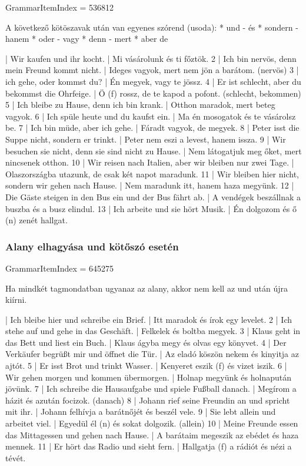 \documentclass{article}
\newenvironment{desc}{\verbatim}{\endverbatim}
\newenvironment{exmp}{\verbatim}{\endverbatim}
\begin{document}
GrammarItemIndex = 536812

\begin{desc}
A következő kötöszavak után van egyenes szórend (usoda):
* und - és
* sondern - hanem
* oder - vagy
* denn - mert
* aber  de
\end{desc}

\begin{exmp}
1 | Wir kaufen und ihr kocht. | Mi vásárolunk és ti főztök.
2 | Ich bin nervös, denn mein Freund kommt nicht. | Ideges vagyok, mert nem jön a barátom. (nervös)
3 | ich gehe, oder kommst du? | Én megyek, vagy te jössz.
4 | Er ist schlecht, aber du bekommst die Ohrfeige. | Ö (f) rossz, de te kapod a pofont. (schlecht, bekommen)
5 | Ich bleibe zu Hause, denn ich bin krank. | Otthon maradok, mert beteg vagyok.
6 | Ich spüle heute und du kaufst ein. | Ma én mosogatok és te vásárolsz be.
7 | Ich bin müde, aber ich gehe. | Fáradt vagyok, de megyek.
8 | Peter isst die Suppe nicht, sondern er trinkt. | Peter nem eszi a levest, hanem issza.
9 | Wir besuchen sie nicht, denn sie sind nicht zu Hause. | Nem látogatjuk meg őket, mert nincsenek otthon.
10 | Wir reisen nach Italien, aber wir bleiben nur zwei Tage. | Olaszországba utazunk, de csak két napot maradunk.
11 | Wir bleiben hier nicht, sondern wir gehen nach Hause. | Nem maradunk itt, hanem haza megyünk.
12 | Die Gäste steigen in den Bus ein und der Bus fährt ab. | A vendégek beszállnak a buszba és a busz elindul.
13 | Ich arbeite und sie hört Musik. | Én dolgozom és ő (n) zenét hallgat.
\end{exmp}

\subsubsection{Alany elhagyása und kötőszó esetén}

GrammarItemIndex = 645275

\begin{desc}
Ha mindkét tagmondatban ugyanaz az alany, akkor nem kell az und után újra kiírni.
\end{desc}

\begin{exmp}
1 | Ich bleibe hier und schreibe ein Brief. | Itt maradok és írok egy levelet.
2 | Ich stehe auf und gehe in das Geschäft. | Felkelek és boltba megyek.
3 | Klaus geht in das Bett und liest ein Buch. | Klaus ágyba megy és olvas egy könyvet.
4 | Der Verkäufer begrüßt mir und öffnet die Tür. | Az eladó köszön nekem és kinyitja az ajtót.
5 | Er isst Brot und trinkt Wasser. | Kenyeret eszik (f) és vizet iszik.
6 | Wir gehen morgen und kommen übermorgen. | Holnap megyünk és holnapután jövünk.
7 | Ich schreibe die Hausaufgabe und spiele Fußball danach. | Megírom a házit és azután focizok. (danach)
8 | Johann rief seine Freundin an und spricht mit ihr. | Johann felhívja a barátnőjét és beszél vele.
9 | Sie lebt allein und arbeitet viel. | Egyedül él (n) és sokat dolgozik. (allein)
10 | Meine Freunde essen das Mittagessen und gehen nach Hause. | A barátaim megeszik az ebédet és haza mennek.
11 | Er hört das Radio und sieht fern. | Hallgatja (f) a rádiót és nézi a tévét.
\end{exmp}
\end{document}
